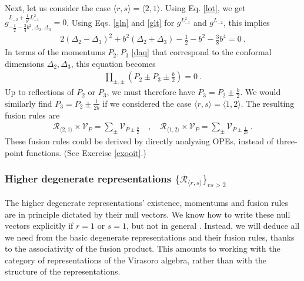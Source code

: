 \documentclass[12pt, a4paper, notitlepage, twoside]{report}
\numberwithin{equation}{section}
\theoremstyle{break}
\begin{document}
Next, let us consider the case $\langle r,s \rangle = \langle 2,1 \rangle$.
Using Eq. \eqref{lot}, we get
$g^{L_{-2} +\frac{1}{b^2} L_{-1}^2 }_{-\frac12 -\frac34 b^2,\Delta_2,\Delta_3} = 0$.
Using Eqs. \eqref{gln} and \eqref{glt} for $g^{L_{-1}^2}$ and $g^{L_{-2}}$, this implies
\begin{align}
 2(\Delta_2-\Delta_3)^2 + b^2 (\Delta_2+\Delta_3) - \frac12 - b^2 -\frac38 b^4= 0\ .
\end{align}
In terms of the momentums $P_2,P_3$ \eqref{daq} that correspond to the conformal dimensions $\Delta_2,\Delta_3$, this equation becomes
\begin{align}
\prod_{\pm,\pm} \left(P_2\pm P_3 \pm \frac{b}{2}\right) = 0 \ .
\end{align}
Up to reflections of $P_2$ or $P_3$, we must therefore have
$
 P_3 = P_2 \pm \frac{b}{2}
$.
We would similarly find $P_3 = P_2 \pm \frac{1}{2b}$ if we considered the case $\langle r,s\rangle = \langle 1,2\rangle$. 
The resulting fusion rules are 
\begin{align}
\boxed{ \mathcal{R}_{\langle 2,1 \rangle}\times \mathcal{V}_P = \sum_\pm \mathcal{V}_{P \pm \frac{b}{2}} }\quad , \quad 
\boxed{ \mathcal{R}_{\langle 1,2 \rangle}\times \mathcal{V}_P = \sum_\pm \mathcal{V}_{P \pm \frac{1}{2b}} }\ .
\label{rot}
\end{align}
These fusion rules could be derived by directly analyzing OPEs, instead of three-point functions. (See Exercise \ref{exooit}.) 

\subsubsection{Higher degenerate representations $\{\mathcal{R}_{\langle r,s\rangle}\}_{rs>2}$}

The higher degenerate representations' existence, momentums and fusion rules are in principle dictated by their null vectors. We know how to write these null vectors explicitly if $r=1$ or $s=1$, but not in general \cite{fms97}.
Instead, we will deduce all we need from the basic degenerate representations and their fusion rules, thanks to the associativity of the fusion product. 
This amounts to working with the category of representations of the Virasoro algebra, rather than with the structure of the representations. 
\end{document}
